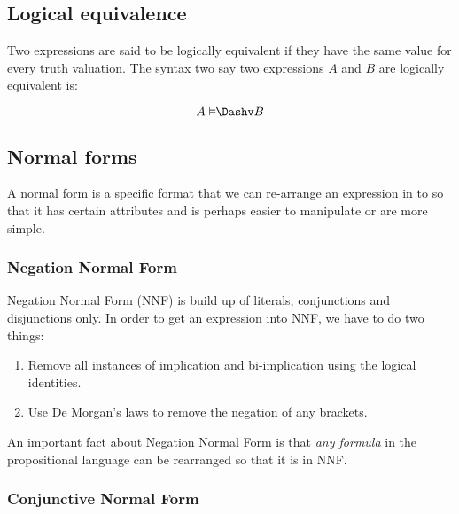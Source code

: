 \subsection{Logical equivalence}

Two expressions are said to be logically equivalent if they have the same value
for every truth valuation. The syntax two say two expressions $A$ and $B$ are
logically equivalent is:

\begin{dmath}
	{ A \logicEquiv B}
\end{dmath}

\subsection{Normal forms}

A normal form is a specific format that we can re-arrange an expression in to so
that it has certain attributes and is perhaps easier to manipulate or are more
simple.

\subsubsection{Negation Normal Form}

Negation Normal Form (NNF) is build up of literals, conjunctions and
disjunctions only. In order to get an expression into NNF, we have to do two
things:

\begin{enumerate}
	\item Remove all instances of implication and bi-implication using the
	logical identities.
	\item Use De Morgan's laws to remove the negation of any brackets.
\end{enumerate}

An important fact about Negation Normal Form is that {\it any formula} in the
propositional language can be rearranged so that it is in NNF.


\subsubsection{Conjunctive Normal Form}

